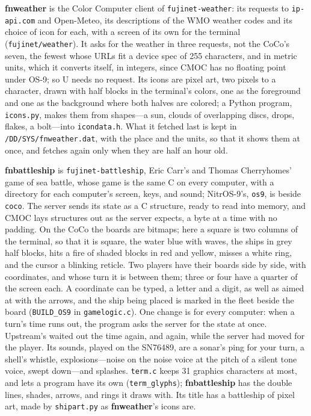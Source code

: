 \documentclass[10pt,twoside,openany]{book}
\newcommand{\cmd}[1]{\textbf{#1}}            %
\newcommand{\file}[1]{\texttt{#1}}           %
\newcommand{\key}[1]{\textsf{\small #1}}     %
\begin{document}
\cmd{fnweather} is the Color Computer client of \texttt{fujinet-weather}:
its requests to \texttt{ip-api.com} and Open-Meteo, its descriptions of
the WMO weather codes and its choice of icon for each, with a screen of
its own for the terminal (\file{fujinet/weather}). It asks for the
weather in three requests, not the CoCo's seven, the fewest whose URLs
fit a device spec of 255 characters, and in metric units, which it
converts itself, in integers, since CMOC has no floating point under
OS-9; so \key{U} needs no request. Its icons are pixel art, two pixels to
a character, drawn with half blocks in the terminal's colors, one as the
foreground and one as the background where both halves are colored; a
Python program, \file{icons.py}, makes them from shapes---a sun, clouds of
overlapping discs, drops, flakes, a bolt---into \file{icondata.h}. What
it fetched last is kept in \file{/DD/SYS/fnweather.dat}, with the place
and the units, so that it shows them at once, and fetches again only when
they are half an hour old.

\cmd{fnbattleship} is \texttt{fujinet-battleship}, Eric Carr's and
Thomas Cherryhomes' game of sea battle, whose game is the same C on every
computer, with a directory for each computer's screen, keys, and sound;
NitrOS-9's, \file{os9}, is beside \file{coco}. The server sends its state
as a C structure, ready to read into memory, and CMOC lays structures out
as the server expects, a byte at a time with no padding. On the CoCo the
boards are bitmaps; here a square is two columns of the terminal, so that
it is square, the water blue with waves, the ships in grey half blocks,
hits a fire of shaded blocks in red and yellow, misses a white ring, and
the cursor a blinking reticle. Two players have their boards side by
side, with coordinates, and whose turn it is between them; three or four
have a quarter of the screen each. A coordinate can be typed, a letter
and a digit, as well as aimed at with the arrows, and the ship being
placed is marked in the fleet beside the board (\texttt{BUILD\_OS9} in
\file{gamelogic.c}). One change is for every computer: when a turn's time
runs out, the program asks the server for the state at once. Upstream's
waited out the time again, and again, while the server had moved for
the player. Its sounds, played on the SN76489, are a sonar's
ping for your turn, a shell's whistle, explosions---noise on the noise
voice at the pitch of a silent tone voice, swept down---and splashes.
\file{term.c} keeps 31 graphics characters at most, and lets a program
have its own (\texttt{term\_glyphs}); \cmd{fnbattleship} has the double
lines, shades, arrows, and rings it draws with. Its title has a
battleship of pixel art, made by \file{shipart.py} as \cmd{fnweather}'s
icons are.
\end{document}
